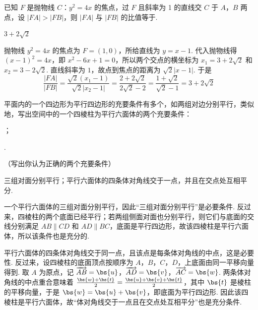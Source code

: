 \begin{problem}
已知 \(F\) 是抛物线 \(C\)：\( y^{2} = 4x \) 的焦点，过 \(F\) 且斜率为 1 的直线交 \(C\) 于 \(A\)，\(B\) 两点，设 \( |FA| > |FB| \)，则 \( |FA| \) 与 \( |FB| \) 的比值等于\fillinblank{}.
\end{problem}

\begin{answer}
\(3+2\sqrt{2}\)
\end{answer}

\begin{solution}
抛物线 \(y^2=4x\) 的焦点为 \(F=(1,0)\)，所给直线为 \(y=x-1\). 代入抛物线得 \((x-1)^2=4x\)，即 \(x^2-6x+1=0\)，所以两个交点的横坐标为 \(x_1=3+2\sqrt{2}\) 和 \(x_2=3-2\sqrt{2}\). 直线斜率为 \(1\)，故点到焦点的距离为 \(\sqrt{2}|x-1|\). 于是
\[
\frac{|FA|}{|FB|}=\frac{\sqrt{2}(x_1-1)}{\sqrt{2}|x_2-1|}=\frac{2+2\sqrt{2}}{2\sqrt{2}-2}=\frac{1+\sqrt{2}}{\sqrt{2}-1}=3+2\sqrt{2}
\]
\end{solution}

\begin{problem}
平面内的一个四边形为平行四边形的充要条件有多个，如两组对边分别平行，类似地，写出空间中的一个四棱柱为平行六面体的两个充要条件：

\begin{circlelist}
\item\fillinblank{}；
\item\fillinblank{}.
\end{circlelist}

（写出你认为正确的两个充要条件）
\end{problem}

\begin{answer}
三组对面分别平行；平行六面体的四条体对角线交于一点，并且在交点处互相平分.
\end{answer}

\begin{solution}
一个平行六面体的三组对面分别平行，因此“三组对面分别平行”是必要条件. 反过来，四棱柱的两个底面已经平行；若两组侧面对面也分别平行，则它们与底面的交线分别满足 \(AB\parallel CD\) 和 \(AD\parallel BC\)，底面是平行四边形，故该四棱柱是平行六面体，所以该条件也是充分的.

平行六面体的四条体对角线交于同一点，且该点是每条体对角线的中点，这是必要性. 反过来，设四棱柱的底面顶点按顺序为 \(A\)，\(B\)，\(C\)，\(D\)，上底面由同一平移向量得到. 取 \(A\) 为原点，记 \(\overrightarrow{AB}=\bs{u}\)，\(\overrightarrow{AD}=\bs{v}\)，\(\overrightarrow{AC}=\bs{w}\). 两条体对角线的中点重合意味着 \(\frac{\bs{w}+\bs{t}}{2}=\frac{\bs{u}+\bs{v}+\bs{t}}{2}\)，其中 \(\bs{t}\) 是棱柱的平移向量，于是 \(\bs{w}=\bs{u}+\bs{v}\)，即底面为平行四边形. 因此该四棱柱是平行六面体，故“体对角线交于一点且在交点处互相平分”也是充分条件.
\end{solution}

